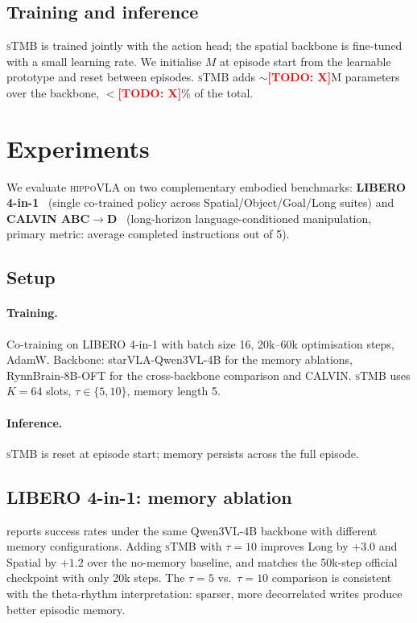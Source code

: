 \documentclass[10pt,letterpaper]{article}
\newcommand{\todo}[1]{\textcolor{red}{\textbf{[TODO: #1]}}}
\newcommand{\method}{\textsc{hippoVLA}\xspace}
\newcommand{\sTMB}{\textsc{sTMB}\xspace}
\begin{document}
\subsection{Training and inference}
\sTMB is trained jointly with the action head; the spatial backbone is fine-tuned with a small learning rate. We initialise $M$ at episode start from the learnable prototype and reset between episodes. \sTMB adds $\sim$\todo{X}M parameters over the backbone, $<$\todo{X}\% of the total.

\section{Experiments}
\label{sec:exp}

We evaluate \method on two complementary embodied benchmarks: \textbf{LIBERO 4-in-1}~\citep{liu2023libero} (single co-trained policy across Spatial/Object/Goal/Long suites) and \textbf{CALVIN ABC$\rightarrow$D}~\citep{mees2022calvin} (long-horizon language-conditioned manipulation, primary metric: average completed instructions out of 5).

\subsection{Setup}
\paragraph{Training.} Co-training on LIBERO 4-in-1 with batch size 16, 20k--60k optimisation steps, AdamW. Backbone: starVLA-Qwen3VL-4B for the memory ablations, RynnBrain-8B-OFT for the cross-backbone comparison and CALVIN. \sTMB uses $K=64$ slots, $\tau \in \{5,10\}$, memory length 5.
\paragraph{Inference.} \sTMB is reset at episode start; memory persists across the full episode.

\subsection{LIBERO 4-in-1: memory ablation}
\label{sec:exp-libero-ablation}
 reports success rates under the same Qwen3VL-4B backbone with different memory configurations. Adding \sTMB with $\tau=10$ improves Long by $+3.0$ and Spatial by $+1.2$ over the no-memory baseline, and matches the 50k-step official checkpoint with only 20k steps. The $\tau=5$ vs.\ $\tau=10$ comparison is consistent with the theta-rhythm interpretation: sparser, more decorrelated writes produce better episodic memory.
\end{document}
